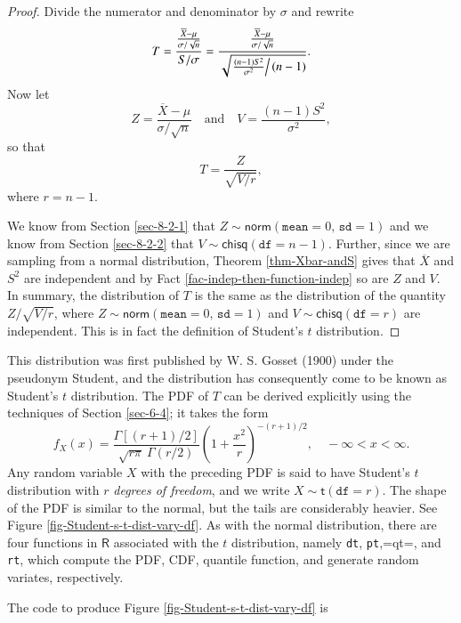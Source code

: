 \documentclass[captions=tableheading]{scrbook}
\begin{document}
\begin{proof}
Divide the numerator and denominator by \(\sigma\) and rewrite
\[
T=\frac{\frac{\overline{X}-\mu}{\sigma/\sqrt{n}}}{S/\sigma}=\frac{\frac{\overline{X}-\mu}{\sigma/\sqrt{n}}}{\sqrt{\left.\frac{(n-1)S^{2}}{\sigma^{2}}\right/ (n-1)}}.
\]
Now let 
\[
Z=\frac{\overline{X}-\mu}{\sigma/\sqrt{n}}\quad \mbox{and}\quad V=\frac{(n-1)S^{2}}{\sigma^{2}},
\]
so that
\begin{equation}
T=\frac{Z}{\sqrt{V/r}},
\end{equation}
where \(r=n-1\).

We know from Section \ref{sec-8-2-1} that \(Z\sim\mathsf{norm}(\mathtt{mean}=0,\,\mathtt{sd}=1)\) and we know from Section \ref{sec-8-2-2} that \(V\sim\mathsf{chisq}(\mathtt{df}=n-1)\). Further, since we are sampling from a normal distribution, Theorem \ref{thm-Xbar-andS} gives that \(\overline{X}\) and \(S^{2}\) are independent and by Fact \ref{fac-indep-then-function-indep} so are \(Z\) and \(V\). In summary, the distribution of \(T\) is the same as the distribution of the quantity \(Z/\sqrt{V/r}\), where \(Z\sim\mathsf{norm}(\mathtt{mean}=0,\,\mathtt{sd}=1)\) and \(V\sim\mathsf{chisq}(\mathtt{df}=r)\) are independent. This is in fact the definition of Student's \(t\) distribution.
\end{proof}

This distribution was first published by W. S. Gosset (1900) under the pseudonym Student, and the distribution has consequently come to be known as Student's \(t\) distribution. The PDF of \(T\) can be derived explicitly using the techniques of Section \ref{sec-6-4}; it takes the form 
\begin{equation}
f_{X}(x)=\frac{\Gamma[(r+1)/2]}{\sqrt{r\pi}\ \Gamma(r/2)}\left(1+\frac{x^{2}}{r}\right)^{-(r+1)/2},\quad -\infty < x < \infty.
\end{equation}
Any random variable \(X\) with the preceding PDF is said to have Student's \(t\) distribution with \(r\) \emph{degrees of freedom}, and we write \(X\sim\mathsf{t}(\mathtt{df}=r)\). The shape of the PDF is similar to the normal, but the tails are considerably heavier. See Figure \ref{fig-Student-s-t-dist-vary-df}. As with the normal distribution, there are four functions in \(\mathsf{R}\) associated with the \(t\) distribution, namely \texttt{dt}, \texttt{pt},=qt=, and \texttt{rt}, which compute the PDF, CDF, quantile function, and generate random variates, respectively.


The code to produce Figure \ref{fig-Student-s-t-dist-vary-df} is
\end{document}
